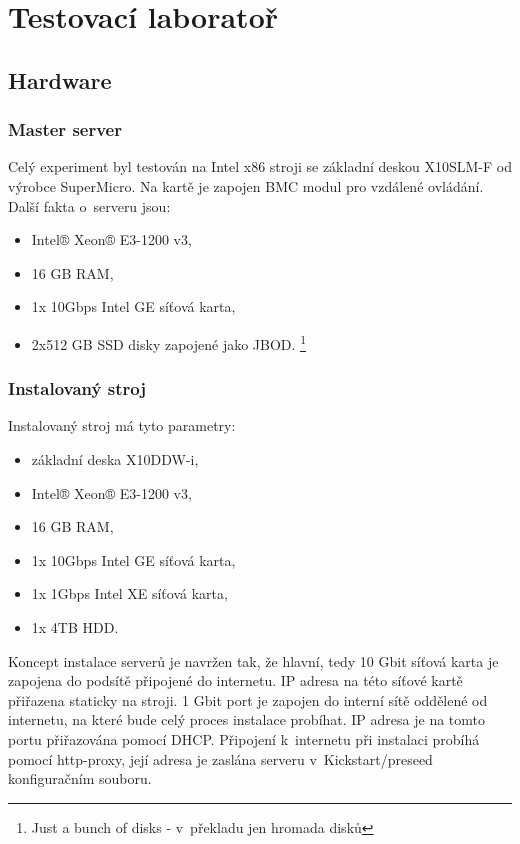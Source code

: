 \section{Testovací laboratoř}


\subsection{Hardware}
\subsubsection{Master server}

Celý experiment byl testován na Intel x86 stroji se základní deskou X10SLM-F od výrobce SuperMicro. Na kartě je zapojen BMC modul pro vzdálené ovládání. Další fakta o~serveru jsou:

\begin{itemize}
\item Intel® Xeon® E3-1200 v3,
\item 16 GB RAM,
\item 1x 10Gbps Intel GE síťová karta,
\item 2x512 GB SSD disky zapojené jako JBOD. \footnote{Just a bunch of disks - v~překladu jen hromada disků}
\end{itemize}


\subsubsection{Instalovaný stroj}

Instalovaný stroj má tyto parametry:

\begin{itemize}
\item základní deska X10DDW-i,
\item Intel® Xeon® E3-1200 v3,
\item 16 GB RAM,
\item 1x 10Gbps Intel GE síťová karta,
\item 1x 1Gbps Intel XE síťová karta,
\item 1x 4TB HDD.
\end{itemize}

Koncept instalace serverů je navržen tak, že hlavní, tedy 10 Gbit síťová karta je zapojena do podsítě připojené do internetu. IP adresa na této síťové kartě přiřazena staticky na stroji. 1 Gbit port je zapojen do interní sítě oddělené od internetu, na které bude celý proces instalace probíhat. IP adresa je na tomto portu přiřazována pomocí DHCP. Připojení k~internetu při instalaci probíhá pomocí http-proxy, její adresa je zaslána serveru v~Kickstart/preseed konfiguračním souboru.


